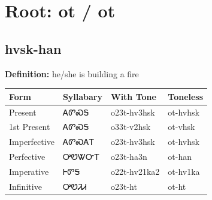 \documentclass{article}%
\begin{document}
%
\normalsize%
\section*{Root: ot / ot}%
\subsection*{hvsk-han}%
\textbf{Definition: }%
he/she is building a fire%
\\[0.5em]%
\begin{tabular}{|l|l|l|l|}%
\hline%
\textbf{Form}&\textbf{Syllabary}&\textbf{With Tone}&\textbf{Toneless}\\%
\hline%
Present&ᎪᏛᏍᎦ&o23t{-}hv3hsk&ot{-}hvhsk\\%
1st Present&ᎪᏛᏍᎦ&o33t{-}v2hsk&ot{-}vhsk\\%
Imperfective&ᎪᏛᏍᎪᎢ&o23t{-}hv3hsk&ot{-}hvhsk\\%
Perfective&ᎤᏬᏔᏅᎢ&o23t{-}ha3n&ot{-}han\\%
Imperative&ᎰᏛᎦ&o22t{-}hv21ka2&ot{-}hv1ka\\%
Infinitive&ᎤᏬᏘᏗ&o23t{-}ht&ot{-}ht\\%
\hline%
\end{tabular}%
\\[1em]%
\end{document}
